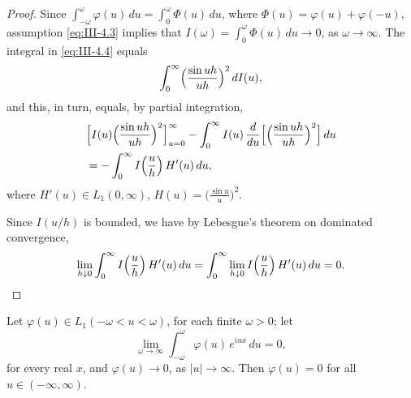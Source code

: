 \begin{proof}
Since $\int_{-\omega}^{\omega}\varphi(u)\,du=\int_{0}^{\omega}\Phi(u)\,du$, where $\Phi(u)=\varphi(u)+\varphi(-u)$, assumption \eqref{eq:III-4.3} implies that $I(\omega)=\int_{0}^{\omega}\Phi(u)\,du\to0$, as $\omega\to\infty$. The integral in \eqref{eq:III-4.4} equals
\[
\int_{0}^{\infty}\Bigl(\frac{\sin uh}{uh}\Bigr)^{2}\,dI(u),
\]
and this, in turn, equals, by partial integration,
\[
\begin{aligned}
&\Bigl[I(u)\Bigl(\frac{\sin uh}{uh}\Bigr)^{2}\Bigr]_{u=0}^{\infty} - \int_{0}^{\infty}I(u)\,\frac{d}{du}  \Bigl[\Bigl(\frac{\sin uh}{uh}\Bigr)^{2}\Bigr]\,du\\
&= -  \int_{0}^{\infty}I  \Bigl(\frac{u}{h}\Bigr)\,H'(u)\,du,
\end{aligned}
\]
where $H'(u)\in L_{1}(0,\infty)$, $H(u)=\bigl(\frac{\sin u}{u}\bigr)^{2}$.

Since $I(u/h)$ is bounded, we have by Lebesgue's theorem on dominated convergence,
\[
\lim_{h\downarrow0}\int_{0}^{\infty}I\Bigl(\frac{u}{h}\Bigr)\,H'(u)\,du
=\int_{0}^{\infty}\lim_{h\downarrow0}I\Bigl(\frac{u}{h}\Bigr)\,H'(u)\,du=0.
\]
\end{proof}

\begin{lemma}\label{lem:III-9}
Let $\varphi(u)\in L_{1}(-\omega<u<\omega)$, for each finite $\omega>0$; let
\[
\lim_{\omega\to\infty}\int_{-\omega}^{\omega}\varphi(u)\,e^{iux}\,du=0,
\]
for every real $x$, and $\varphi(u)\to0$, as $|u|\to\infty$. Then $\varphi(u)=0$ for all $u\in(-\infty,\infty)$.
\end{lemma}


